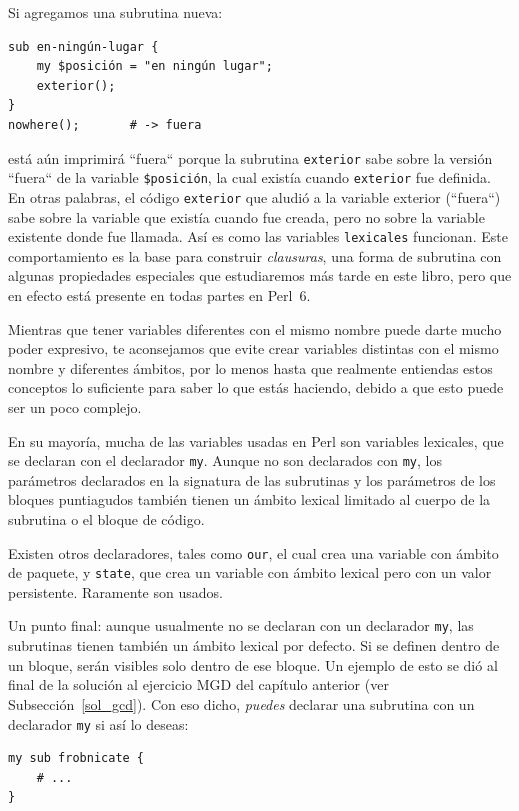 Si agregamos una subrutina nueva:
\begin{verbatim}
sub en-ningún-lugar {
    my $posición = "en ningún lugar";
    exterior();
}
nowhere();       # -> fuera
\end{verbatim}
% 
está aún imprimirá ``fuera`` porque la subrutina {\tt exterior}
sabe sobre la versión ``fuera`` de la variable {\tt \$posición},
la cual existía cuando {\tt exterior} fue definida. En otras palabras,
el código {\tt exterior} que aludió a la variable exterior (``fuera``) 
sabe sobre la variable que existía cuando fue creada, pero no sobre la 
variable existente donde fue llamada. Así es como las variables 
{\tt lexicales} funcionan. Este comportamiento es la base para construir 
\emph{clausuras}, una forma de subrutina con algunas propiedades especiales
que estudiaremos más tarde en este libro, pero que en efecto está 
presente en todas partes en Perl~6.

Mientras que tener variables diferentes con el mismo nombre
puede darte mucho poder expresivo, te aconsejamos que evite 
crear variables distintas con el mismo nombre y diferentes 
ámbitos, por lo menos hasta que realmente entiendas estos 
conceptos lo suficiente para saber lo que estás haciendo, debido
a que esto puede ser un poco complejo.

En su mayoría, mucha de las variables usadas en Perl son variables
lexicales, que se declaran con el declarador {\tt my}. Aunque no son 
declarados con {\tt my}, los parámetros declarados en la 
signatura de las subrutinas y los parámetros de los bloques
puntiagudos también tienen un ámbito lexical limitado al cuerpo de
la subrutina o el bloque de código.

Existen otros declaradores, tales como {\tt our}, el cual crea
una variable con ámbito de paquete, y {\tt state}, que crea
un variable con ámbito lexical pero con un valor persistente.
Raramente son usados.

Un punto final: aunque usualmente no se declaran con 
un declarador {\tt my}, las subrutinas tienen también
un ámbito lexical por defecto. Si se definen dentro de un bloque,
serán visibles solo dentro de ese bloque. Un ejemplo de esto
se dió al final de la solución al ejercicio MGD del capítulo anterior
(ver Subsección~\ref{sol_gcd}). Con eso dicho, \emph{puedes} declarar
una subrutina con un declarador {\tt my} si así lo deseas:

\begin{verbatim}
my sub frobnicate { 
    # ... 
}
\end{verbatim}

